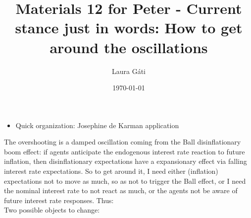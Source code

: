 \documentclass[11pt]{article}
\renewcommand{\[}{\begin{equation}}
\renewcommand{\]}{\end{equation}}
\begin{document}
\linespread{1.0}

\title{Materials 12 for Peter -
Current stance just in words: How to get around the oscillations }
\author{Laura G\'ati} 
\date{\today}
\maketitle



\begin{itemize}
\item Quick organization: Josephine de Karman application
\end{itemize}


The overshooting is a damped oscillation coming from the Ball disinflationary boom effect: if agents anticipate the endogenous interest rate reaction to future inflation, then disinflationary expectations have a expansionary effect via falling interest rate expectations. So to get around it, I need either (inflation) expectations not to move as much, so as not to trigger the Ball effect, or I need the nominal interest rate to not react as much, or the agents not be aware of future interest rate responses. Thus: \\
Two possible objects to change:
\end{document}
